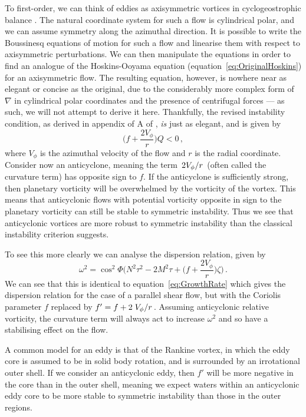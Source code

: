 To first-order, we can think of eddies as axisymmetric vortices in cyclogeostrophic balance \citep{Castelao2011, Cruz-Gomez2013}. The natural coordinate system for such a flow is cylindrical polar, and we can assume symmetry along the azimuthal direction. It is possible to write the Boussinesq equations of motion for such a flow and linearise them with respect to axisymmetric perturbations. We can then manipulate the equations in order to find an analogue of the Hoskins-Ooyama equation (equation~\ref{eq:OriginalHoskins}) for an axisymmetric flow. The resulting equation, however, is nowhere near as elegant or concise as the original, due to the considerably more complex form of $\nabla$ in cylindrical polar coordinates and the presence of centrifugal forces --- as such, we will not attempt to derive it here. Thankfully, the revised instability condition, as derived in appendix of A of \citet{Buckingham2021}, \textit{is} just as elegant, and is given by
\begin{equation}
    \bigg(f + \frac{2 V_\phi}{r}\bigg)Q < 0 \, ,
\end{equation}
where $V_\phi$ is the azimuthal velocity of the flow and $r$ is the radial coordinate. Consider now an anticyclone, meaning the term $\flatfrac{2V_\phi}{r}$ (often called the curvature term) has opposite sign to $f$. If the anticyclone is sufficiently strong, then planetary vorticity will be overwhelmed by the vorticity of the vortex. This means that anticyclonic flows with potential vorticity opposite in sign to the planetary vorticity can still be stable to symmetric instability. Thus we see that anticyclonic vortices are more robust to symmetric instability than the classical instability criterion suggests.

To see this more clearly we can analyse the dispersion relation, given by
\begin{equation}
    \label{eq:GrowthRateCurv}
    \omega^2 = \cos^2\Phi \Bigg(N^2 \tau^2 - 2M^2\tau + \bigg(f + \frac{2V_\phi}{r}\bigg)\zeta\Bigg) \, .
\end{equation}
We can see that this is identical to equation~\ref{eq:GrowthRate} which gives the dispersion relation for the case of a parallel shear flow, but with the Coriolis parameter $f$ replaced by $f' = f + 2 \flatfrac{V_\phi}{r}$. Assuming anticyclonic relative vorticity, the curvature term will always act to increase $\omega^2$ and so have a stabilising effect on the flow.

A common model for an eddy is that of the Rankine vortex, in which the eddy core is assumed to be in solid body rotation, and is surrounded by an irrotational outer shell. If we consider an anticyclonic eddy, then $f'$ will be more negative in the core than in the outer shell, meaning we expect waters within an anticyclonic eddy core to be more stable to symmetric instability than those in the outer regions.

